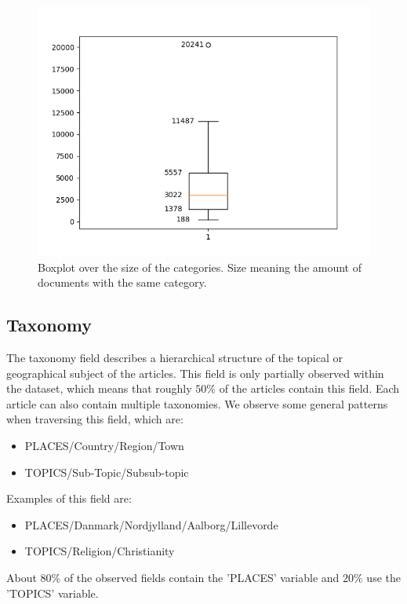 \begin{figure}
	\centering
	\includegraphics[width=1 \linewidth]{figures/category_box.png}
	\caption{Boxplot over the size of the categories. Size meaning the amount of documents with the same category.}
	\label{fig:category_box}
\end{figure}

\subsection{Taxonomy}
The taxonomy field describes a hierarchical structure of the topical or geographical subject of the articles.
This field is only partially observed within the dataset, which means that roughly $50\%$ of the articles contain this field.
Each article can also contain multiple taxonomies.
We observe some general patterns when traversing this field, which are:
\begin{itemize}
	\item PLACES/Country/Region/Town
	\item TOPICS/Sub-Topic/Subsub-topic
\end{itemize}
Examples of this field are:
\begin{itemize}
	\item PLACES/Danmark/Nordjylland/Aalborg/Lillevorde
	\item TOPICS/Religion/Christianity
\end{itemize}
About $80\%$ of the observed fields contain the 'PLACES' variable and $20\%$ use the 'TOPICS' variable. 
